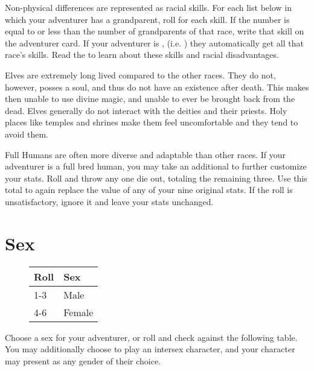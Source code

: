 \begin{multicols*}{2}
Non-physical differences are represented as racial skills. For each list below in which your adventurer has a grandparent, roll  for each skill. If the number is equal to or less than the number of grandparents of that race, write that skill on the adventurer card. If your adventurer is , (i.e. ) they automatically get all that race's skills. Read the  to learn about these skills and racial disadvantages.

Elves are extremely long lived compared to the other races. They do not, however, posses a soul, and thus do not have an existence after death. This makes then unable to use divine magic, and unable to ever be brought back from the dead. Elves generally do not interact with the deities and their priests. Holy places like temples and shrines make them feel uncomfortable and they tend to avoid them.

Full Humans are often more diverse and adaptable than other races. If your adventurer is a full bred human, you may take an additional  to further customize your stats. Roll  and throw any one die out, totaling the remaining three. Use this total to again replace the value of any of your nine original stats. If the roll is unsatisfactory, ignore it and leave your stats unchanged.
\section{Sex}
\begin{wrapfigure}[5]{l}[0pt]{60pt}
\begin{normbox}
\small
\begin{tabular}{@{}l l}
\textbf{Roll} & \textbf{Sex}\\
\midrule
1-3 & Male\\
4-6 & Female
\end{tabular}
\end{normbox}
\end{wrapfigure}
Choose a sex for your adventurer, or roll  and check against the following table. You may additionally choose to play an intersex character, and your character may present as any gender of their choice.

\end{multicols*}
